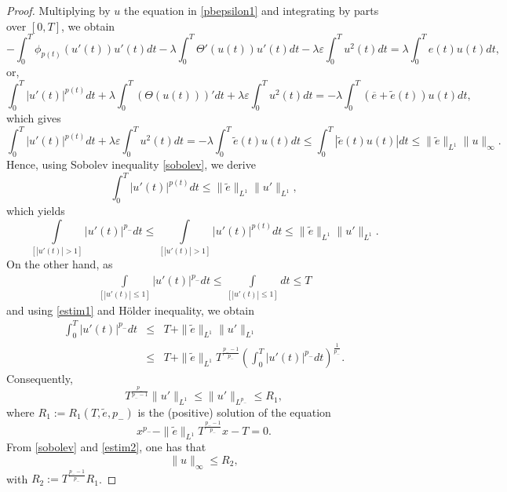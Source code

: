 \documentclass[11pt]{amsart}
\numberwithin{equation}{section} \textwidth=15.5cm
\begin{document}
\begin{proof}
Multiplying by $u$ the equation in \eqref{pbepsilon1} and integrating by parts over $[0,T]$, we obtain
$$-\int_0^T \phi_{p(t)}(u'(t))u'(t)dt-\lambda\int_0^T\Theta'(u(t))u'(t)dt-\lambda\varepsilon\int_0^T u^2(t)dt=\lambda\int_0^Te(t)u(t)dt,$$
or,
$$\int_0^T |u'(t)|^{p(t)}dt+\lambda\int_0^T\left(\Theta(u(t))\right)'dt+\lambda\varepsilon\int_0^T u^2(t)dt=-\lambda\int_0^T(\overline{e}+\tilde{e}(t))u(t)dt,$$
which gives
$$\int_0^T |u'(t)|^{p(t)}dt+\lambda\varepsilon\int_0^T u^2(t)dt=-\lambda\int_0^T\tilde{e}(t)u(t)dt\leq\int_0^T|\tilde{e}(t)u(t)|dt\leq\|\tilde{e}\|_{L^1}\|u\|_\infty.$$
Hence, using Sobolev inequality \eqref{sobolev}, we derive
\begin{equation*}\label{estim}
    \int_0^T |u'(t)|^{p(t)}dt\leq\|\tilde{e}\|_{L^1}\|u'\|_{L^1},
\end{equation*}
which yields
\begin{equation}\label{estim1}
\int\limits_{[|u'(t)|>1]}|u'(t)|^{p_-}dt \leq \int\limits_{[|u'(t)|>1]}|u'(t)|^{p(t)}dt \leq\|\tilde{e}\|_{L^1}\|u'\|_{L^1}.
\end{equation}
On the other hand, as
\begin{eqnarray*}
\int\limits_{[|u'(t)|\leq 1]}|u'(t)|^{p_-}dt \leq \int\limits_{[|u'(t)|\leq 1]}dt  \leq T
\end{eqnarray*}
and using \eqref{estim1} and H\"older inequality, we obtain
\begin{eqnarray*}
\int_0^T |u'(t)|^{p_-}dt &\leq& T + \|\tilde{e}\|_{L^1}\|u'\|_{L^1} \\
&\leq&  T + \|\tilde{e}\|_{L^1}T^{\frac{p_- - 1}{p_-}}\left(\int_0^T |u'(t)|^{p_-}dt \right)^{\frac{1}{p_-}}.
\end{eqnarray*}
Consequently,
 \begin{equation}\label{estim2}
T^{\frac{p_-}{p_- - 1}}\|u'\|_{L^1} \leq \|u'\|_{L^{p_-}} \leq R_1,
\end{equation}
where $R_1 := R_1(T,\tilde e,p_-)$ is the (positive) solution of the equation
$$x^{p_-} - \|\tilde{e}\|_{L^1}T^{\frac{p_- - 1}{p_-}}x - T = 0.$$
From \eqref{sobolev} and \eqref{estim2}, one has that
\begin{equation}\label{jestu}
\|u\|_\infty\leq R_2,
\end{equation}
with $R_2 := T^{\frac{p_- -1}{p_-}}R_1$.


\end{proof}
\end{document}
